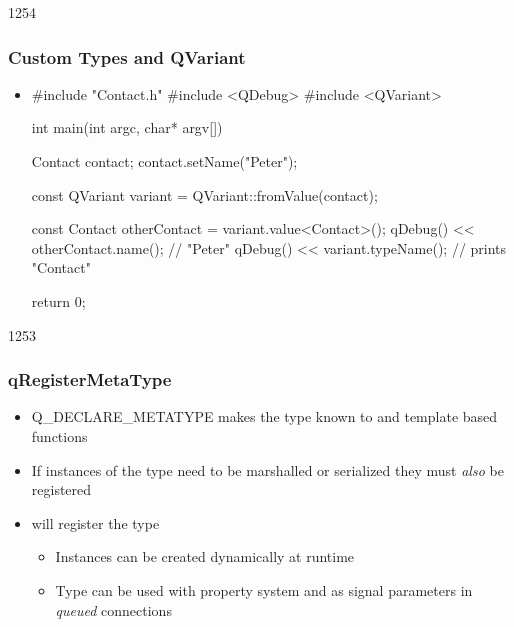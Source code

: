 \begin{slide}[fragile]{1254}
\frametitle{Custom Types and QVariant}

\begin{itemize}
\item[]
\begin{cpp}
#include "Contact.h"
#include <QDebug>
#include <QVariant>

int main(int argc, char* argv[])
{
    Contact contact;
    contact.setName("Peter");

    const QVariant variant = QVariant::fromValue(contact);

    const Contact otherContact = variant.value<Contact>();
    qDebug() << otherContact.name(); // "Peter"
    qDebug() << variant.typeName();  // prints "Contact"

    return 0;
}
\end{cpp}
\end{itemize}
\end{slide}

\begin{slide}{1253}
\frametitle{qRegisterMetaType}
\begin{itemize}
  \item Q\_DECLARE\_METATYPE makes the type known to  and template based functions
  \item If instances of the type need to be marshalled or serialized they must 
        {\it also} be registered
  \item {} will register the type
  \begin{itemize}
    \item Instances can be created dynamically at runtime
    \item Type can be used with property system and as signal parameters in
            \textit{queued} connections 
  \end{itemize}
\end{itemize}
\end{slide}

